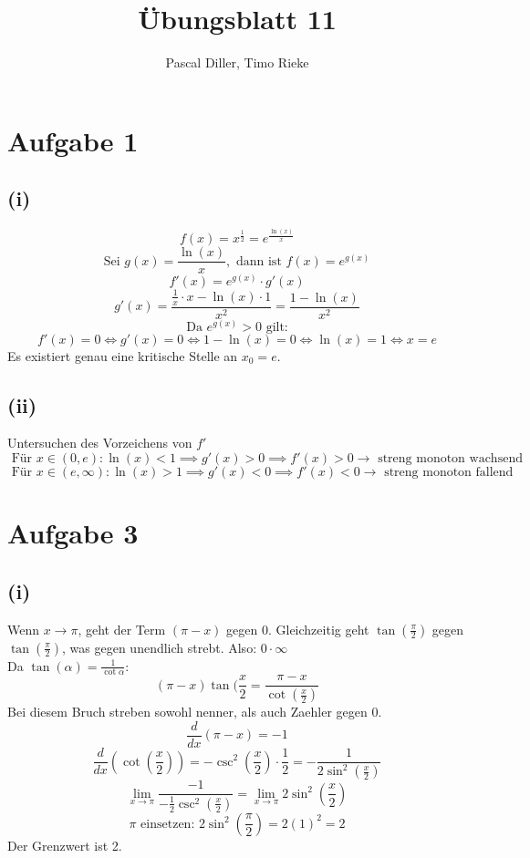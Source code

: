 \documentclass{article}
\title{Übungsblatt 11}
\author{Pascal Diller, Timo Rieke}
\begin{document}
\maketitle

\section*{Aufgabe 1}
\subsection*{(i)}
\[f(x) = x^{\frac{1}{2}} = e^{\frac{\ln(x)}{x}}\]
\[\text{Sei } g(x) = \frac{\ln(x)}{x}, \text{ dann ist } f(x) = e^{g(x)}\]
\[f'(x) = e^{g(x)} \cdot g'(x)\]
\[g'(x) = \frac{\frac{1}{x} \cdot x - \ln(x) \cdot 1}{x^2} = \frac{1 - \ln(x)}{x^2}\]
\[\text{Da } e^{g(x)} > 0 \text{ gilt:} \]
\[f'(x) = 0 \Leftrightarrow g'(x) = 0 \Leftrightarrow 1 - \ln(x) = 0 \Leftrightarrow \ln(x) = 1 \Leftrightarrow x = e\]
\[\]
Es existiert genau eine kritische Stelle an $x_0 = e$.

\subsection*{(ii)}
Untersuchen des Vorzeichens von $f'$
\[\text{ Für } x \in (0, e): \ln(x) < 1 \implies g'(x) > 0 \implies f'(x) > 0 \to \text{ streng monoton wachsend}\]
\[\text{ Für } x \in (e, \infty): \ln(x) > 1 \implies g'(x) < 0 \implies f'(x) < 0 \to \text{ streng monoton fallend}\]

\section*{Aufgabe 3}
\subsection*{(i)}
Wenn $x \to \pi$, geht der Term $(\pi - x)$ gegen 0. Gleichzeitig geht $\tan(\frac{\pi}{2})$ gegen $\tan(\frac{\pi}{2})$, was gegen unendlich strebt. Also: $0 \cdot \infty$ \\
Da $\tan(\alpha) = \frac{1}{\cot{\alpha}}$:
\[(\pi - x)\tan(\frac{x}{2} = \frac{\pi - x}{\cot(\frac{x}{2})}\]
Bei diesem Bruch streben sowohl nenner, als auch Zaehler gegen 0.
\[\frac{d}{dx}(\pi - x) = -1\]
\[\frac{d}{dx}(\cot(\frac{x}{2})) = -\csc^2(\frac{x}{2}) \cdot \frac{1}{2} = -\frac{1}{2 \sin^2(\frac{x}{2})}\]
\[\lim_{x\to\pi} \frac{-1}{-\frac{1}{2} \csc^2(\frac{x}{2})} = \lim_{x\to\pi} 2 \sin^2(\frac{x}{2})\]
\[\pi\text{ einsetzen: } 2\sin^2(\frac{\pi}{2}) = 2(1)^2 = 2\]
Der Grenzwert ist 2.
\end{document}
